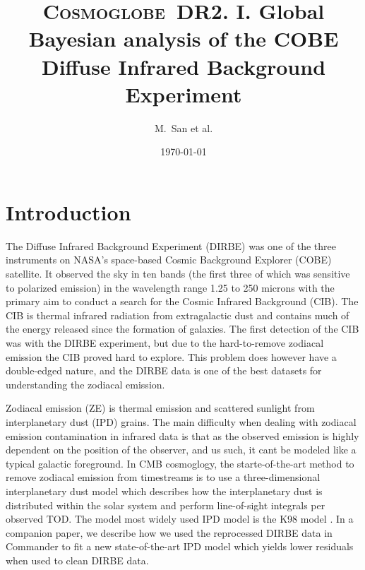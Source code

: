 \documentclass{aa}
\def\Cosmoglobe{\textsc{Cosmoglobe}}
\begin{document}
 


   \title{\bfseries{\Cosmoglobe\ DR2. I. Global Bayesian analysis of the COBE Diffuse Infrared Background Experiment }}

   \author{M.~San et al.}

  
   \titlerunning{\Cosmoglobe: DIRBE analysis}

   \date{\today} 
   
  \abstract{\blindtext}


   \maketitle

\section{Introduction}
The Diffuse Infrared Background Experiment (DIRBE) \citep{DIRBE} was one of the three instruments on NASA's space-based Cosmic Background Explorer (COBE) satellite. It observed the sky in ten bands (the first three of which was sensitive to polarized emission) in the wavelength range 1.25 to 250 microns with the primary aim to conduct a search for the Cosmic Infrared Background (CIB). The CIB is thermal infrared radiation from extragalactic dust and contains much of the energy released since the formation of galaxies. The first detection of the CIB was with the DIRBE experiment, but due to the hard-to-remove zodiacal emission the CIB proved hard to explore. This problem does however have a double-edged nature, and the DIRBE data is one of the best datasets for understanding the zodiacal emission. 

Zodiacal emission (ZE) is thermal emission and scattered sunlight from interplanetary dust (IPD) grains. The main difficulty when dealing with zodiacal emission contamination in infrared data is that as the observed emission is highly dependent on the position of the observer, and us such, it cant be modeled like a typical galactic foreground. In CMB cosmoglogy, the starte-of-the-art method to remove zodiacal emission from timestreams is to use a three-dimensional interplanetary dust model which describes how the interplanetary dust is distributed within the solar system and perform line-of-sight integrals per observed TOD. The model most widely used IPD model is the K98 model \citep{K98}. In a companion paper, we describe how we used the reprocessed DIRBE data in Commander to fit a new state-of-the-art IPD model which yields lower residuals when used to clean DIRBE data.
\end{document}
